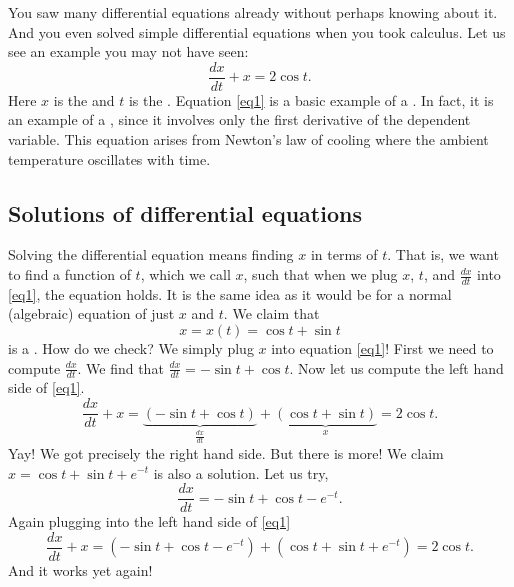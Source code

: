 You saw many
differential equations already without perhaps knowing about it.
And you even solved simple
differential equations when you took calculus.
Let us see an example you may not have seen:
\begin{equation} \label{eq1}
\frac{dx}{dt} + x = 2 \cos t .
\end{equation}
Here $x$ is the \emph{} and $t$ is the
\emph{}.
Equation \eqref{eq1}
is a basic example of a \emph{}.  In fact, it
is an example of a \emph{}, since
it involves only the first derivative of the dependent variable.  This 
equation arises from Newton's law of cooling where the ambient
temperature oscillates with time.

\subsection{Solutions of differential equations}

Solving the differential equation means finding $x$ in terms of $t$.  That
is, we want to find a function of $t$, which we call $x$, such that when
we plug $x$, $t$, and $\frac{dx}{dt}$ into \eqref{eq1}, the equation holds.
It is
the same idea as it would be for a normal (algebraic) equation of just
$x$ and $t$.  We claim that
\begin{equation*}
x = x(t) = \cos t + \sin t
\end{equation*}
is a \emph{}.
How do we check?  We simply plug $x$ into equation \eqref{eq1}!  First we
need to compute $\frac{dx}{dt}$.  We find that $\frac{dx}{dt} = 
-\sin t + \cos t$.  Now let us compute the left hand side
of \eqref{eq1}.
\begin{equation*}
\frac{dx}{dt} + x = 
\underbrace{(-\sin t + \cos t)}_{\frac{dx}{dt}}
+
\underbrace{(\cos t + \sin t)}_{x}
=
2\cos t .
\end{equation*}
Yay!  We got precisely the right hand side.
But there is more!
We claim
$x = \cos t + \sin t + e^{-t}$ is also
a solution.  Let us try,
\begin{equation*}
\frac{dx}{dt} = -\sin t + \cos t - e^{-t} .
\end{equation*}
Again plugging into the left hand side of \eqref{eq1}
\begin{equation*}
\frac{dx}{dt} + x = 
(-\sin t + \cos t - e^{-t}) +
(\cos t + \sin t + e^{-t})
= 2\cos t .
\end{equation*}
And it works yet again!

